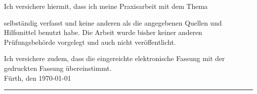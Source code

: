 Ich versichere hiermit, dass ich meine Praxisarbeit mit dem Thema
\begin{quote}
\textit{\titel} \textit{\untertitel }
\end{quote}
selbständig verfasst und keine anderen als die angegebenen Quellen und Hilfsmittel benutzt habe. Die Arbeit wurde bisher keiner anderen Prüfungsbehörde vorgelegt und auch nicht veröffentlicht.


Ich versichere zudem, dass die eingereichte elektronische Fassung mit der gedruckten Fassung übereinstimmt.\\[10ex]

Fürth, den \today \\[4ex]


\rule[-0.2cm]{5cm}{0.5pt} \\

\textsc{\autor} \\[10ex]
